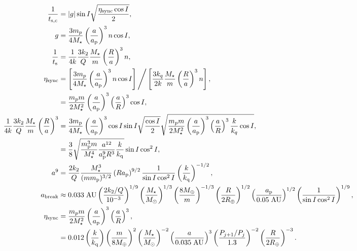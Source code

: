 \documentclass[11pt,
        usenames, %
        dvipsnames %
    ]{article}
\newcommand*{\abs}[1]{\left|#1\right|}
\newcommand*{\p}[1]{\left(#1\right)}
\newcommand*{\s}[1]{\left[#1\right]}
\begin{document}
\begin{align}
    \frac{1}{t_{\rm s, c}} &= \abs{g}\sin I \sqrt{\frac{\eta_{\rm sync} \cos
        I}{2}},\\
    g &= \frac{3m_p}{4M_{\star}}\p{\frac{a}{a_{\rm p}}}^3 n\cos I,\\
    \frac{1}{t_{\rm s}} &= \frac{1}{4k}\frac{3k_2}{Q} \frac{M_{\star}}{m}
        \p{\frac{R}{a}}^3 n,\\
    \eta_{\rm sync} &= \s{\frac{3m_p}{4M_{\star}}\p{\frac{a}{a_{\rm p}}}^3 n
        \cos I}
        \Bigg/ \s{\frac{3k_q}{2k} \frac{M_\star}{m}\p{\frac{R}{a}}^3 n},\\
        &= \frac{m_pm}{2M_\star^2}\p{\frac{a}{a_{\rm p}}}^3
            \p{\frac{a}{R}}^3 \cos I,\\
    \frac{1}{4k}\frac{3k_2}{Q}\frac{M_\star}{m}\p{\frac{R}{a}}^3
        &= \frac{3m_{\rm p}}{4M_{\star}}\p{\frac{a}{a_{\rm p}}}^3
            \cos I \sin I \sqrt{\frac{\cos I}{2}}
            \sqrt{\frac{m_pm}{2M_\star^2}\p{\frac{a}{a_{\rm p}}}^3
                \p{\frac{a}{R}}^3 \frac{k}{k_q}\cos I},\\
        &= \frac{3}{8}\sqrt{\frac{m_{\rm p}^3m}{M_\star^4}
            \frac{a^{12}}{a_{\rm p}^9 R^3}
            \frac{k}{k_{\rm q}}}
            \sin I \cos^2 I,\\
    a^9 &= \frac{2k_2}{Q} \frac{M_\star^3}{(mm_{\rm p})^{3/2}}
        \p{Ra_{\rm p}}^{9/2}\frac{1}{\sin I \cos^2 I}
        \p{\frac{k}{k_{\rm q}}}^{-1/2},\\
    a_{\rm break} &\approx 0.033 \;\mathrm{AU}
        \p{\frac{2k_2/Q}{10^{-3}}}^{1/9}
        \p{\frac{M_\star}{M_{\odot}}}^{1/3}
        \p{\frac{8M_{\oplus}}{m}}^{-1/3}
        \p{\frac{R}{2R_{\oplus}}}^{1/2}
        \p{\frac{a_{\rm p}}{0.05\;\mathrm{AU}}}^{1/2}
        \p{\frac{1}{\sin I \cos^2 I}}^{1/9},\\
    \eta_{\rm sync} &= \frac{m_pm}{2M_\star^2}\p{\frac{a}{a_{\rm p}}}^3
            \p{\frac{a}{R}}^3,\\
        &= 0.012 \p{\frac{k}{k_{\rm q}}}
                \p{\frac{m}{8 M_{\oplus}}}^2
                \p{\frac{M_\star}{M_{\odot}}}^{-2}
            \p{\frac{a}{0.035 \;\mathrm{AU}}}^{3}
                \p{\frac{P_{j + 1} / P_j}{1.3}}^{-2}
                \p{\frac{R}{2R_{\oplus}}}^{-3}.
\end{align}
\end{document}
